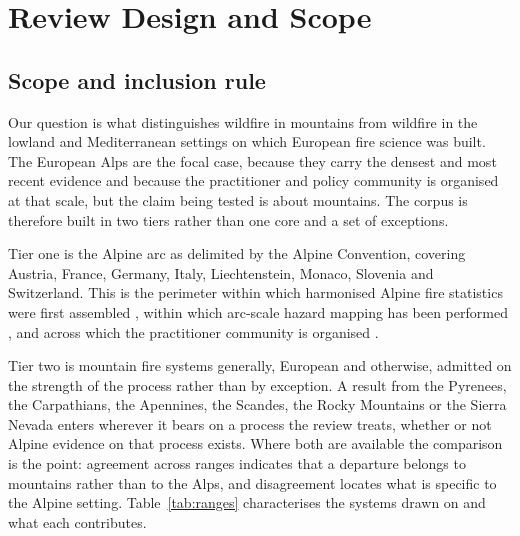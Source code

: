 \documentclass[11pt,a4paper]{article}
\begin{document}
\section{Review Design and Scope}
\label{sec:scope}

\subsection{Scope and inclusion rule}

Our question is what distinguishes wildfire in mountains from wildfire in the lowland and Mediterranean settings on which European fire science was built. The European Alps are the focal case, because they carry the densest and most recent evidence and because the practitioner and policy community is organised at that scale, but the claim being tested is about mountains. The corpus is therefore built in two tiers rather than one core and a set of exceptions.

Tier one is the Alpine arc as delimited by the Alpine Convention, covering Austria, France, Germany, Italy, Liechtenstein, Monaco, Slovenia and Switzerland. This is the perimeter within which harmonised Alpine fire statistics were first assembled \citep{valese_wildfires_2011, muller_forest_2020}, within which arc-scale hazard mapping has been performed \citep{gerberding_mapping_2025}, and across which the practitioner community is organised \citep{hoang_stakeholders_2026}.

Tier two is mountain fire systems generally, European and otherwise, admitted on the strength of the process rather than by exception. A result from the Pyrenees, the Carpathians, the Apennines, the Scandes, the Rocky Mountains or the Sierra Nevada enters wherever it bears on a process the review treats, whether or not Alpine evidence on that process exists. Where both are available the comparison is the point: agreement across ranges indicates that a departure belongs to mountains rather than to the Alps, and disagreement locates what is specific to the Alpine setting. Table~\ref{tab:ranges} characterises the systems drawn on and what each contributes.
\end{document}

